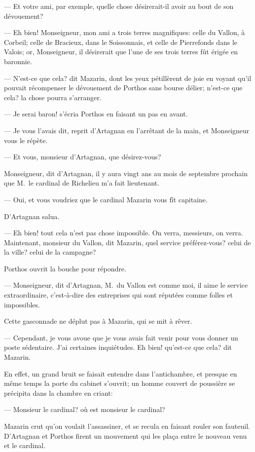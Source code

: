 — Et votre ami, par exemple, quelle chose désirerait-il avoir au bout de son dévouement?

— Eh bien! Monseigneur, mon ami a trois terres magnifiques: celle du Vallon, à Corbeil; celle de Bracieux, dans le Soissonnais, et celle de Pierrefonds dans le Valois; or, Monseigneur, il désirerait que l'une de ses trois terres fût érigée en baronnie.

— N'est-ce que cela? dit Mazarin, dont les yeux pétillèrent de joie en voyant qu'il pouvait récompenser le dévouement de Porthos sans bourse délier; n'est-ce que cela? la chose pourra s'arranger.

— Je serai baron! s'écria Porthos en faisant un pas en avant.

— Je vous l'avais dit, reprit d'Artagnan en l'arrêtant de la main, et Monseigneur vous le répète.

— Et vous, monsieur d'Artagnan, que désirez-vous?

Monseigneur, dit d'Artagnan, il y aura vingt ans au mois de septembre prochain que M.~le cardinal de Richelieu m'a fait lieutenant.

— Oui, et vous voudriez que le cardinal Mazarin vous fît capitaine.

D'Artagnan salua.

— Eh bien! tout cela n'est pas chose impossible. On verra, messieurs, on verra. Maintenant, monsieur du Vallon, dit Mazarin, quel service préférez-vous? celui de la ville? celui de la campagne?

Porthos ouvrit la bouche pour répondre.

— Monseigneur, dit d'Artagnan, M.~du Vallon est comme moi, il aime le service extraordinaire, c'est-à-dire des entreprises qui sont réputées comme folles et impossibles.

Cette gasconnade ne déplut pas à Mazarin, qui se mit à rêver.

— Cependant, je vous avoue que je vous avais fait venir pour vous donner un poste sédentaire. J'ai certaines inquiétudes. Eh bien! qu'est-ce que cela? dit Mazarin.

En effet, un grand bruit se faisait entendre dans l'antichambre, et presque en même temps la porte du cabinet s'ouvrit; un homme couvert de poussière se précipita dans la chambre en criant:

— Monsieur le cardinal? où est monsieur le cardinal?

Mazarin crut qu'on voulait l'assassiner, et se recula en faisant rouler son fauteuil. D'Artagnan et Porthos firent un mouvement qui les plaça entre le nouveau venu et le cardinal.

